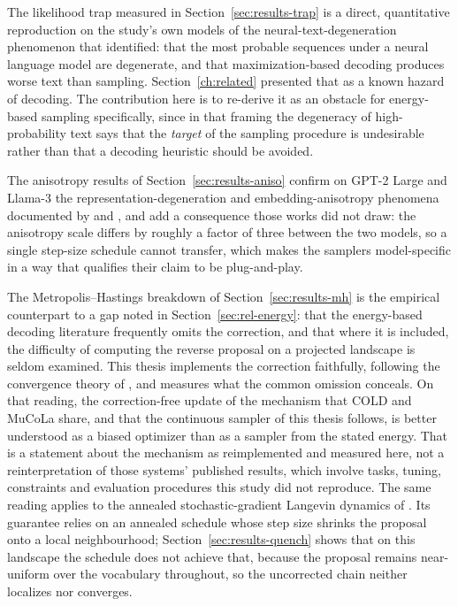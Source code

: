 The likelihood trap measured in Section~\ref{sec:results-trap} is a direct, quantitative reproduction on the study's own models of the neural-text-degeneration phenomenon that \citet{holtzman2020curious} identified: that the most probable sequences under a neural language model are degenerate, and that maximization-based decoding produces worse text than sampling. Section~\ref{ch:related} presented that as a known hazard of decoding. The contribution here is to re-derive it as an obstacle for energy-based sampling specifically, since in that framing the degeneracy of high-probability text says that the \emph{target} of the sampling procedure is undesirable rather than that a decoding heuristic should be avoided.

The anisotropy results of Section~\ref{sec:results-aniso} confirm on GPT-2 Large and Llama-3 the representation-degeneration and embedding-anisotropy phenomena documented by \citet{gao2019representation} and \citet{ethayarajh2019contextual}, and add a consequence those works did not draw: the anisotropy scale differs by roughly a factor of three between the two models, so a single step-size schedule cannot transfer, which makes the samplers model-specific in a way that qualifies their claim to be plug-and-play.

The Metropolis--Hastings breakdown of Section~\ref{sec:results-mh} is the empirical counterpart to a gap noted in Section~\ref{sec:rel-energy}: that the energy-based decoding literature frequently omits the correction, and that where it is included, the difficulty of computing the reverse proposal on a projected landscape is seldom examined. This thesis implements the correction faithfully, following the convergence theory of \citet{roberts1996exponential}, and measures what the common omission conceals. On that reading, the correction-free update of the mechanism that COLD \citep{qin2022cold} and MuCoLa \citep{kumar2022gradient} share, and that the continuous sampler of this thesis follows, is better understood as a biased optimizer than as a sampler from the stated energy. That is a statement about the mechanism as reimplemented and measured here, not a reinterpretation of those systems' published results, which involve tasks, tuning, constraints and evaluation procedures this study did not reproduce. The same reading applies to the annealed stochastic-gradient Langevin dynamics of \citet{welling2011bayesian}. Its guarantee relies on an annealed schedule whose step size shrinks the proposal onto a local neighbourhood; Section~\ref{sec:results-quench} shows that on this landscape the schedule does not achieve that, because the proposal remains near-uniform over the vocabulary throughout, so the uncorrected chain neither localizes nor converges.


